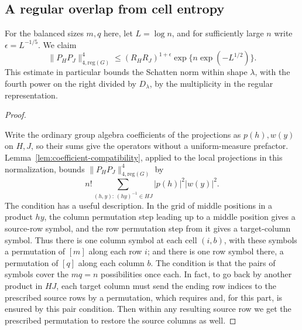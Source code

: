\subsection{A regular overlap from cell entropy}

\begin{proposition}\label{tra:harmonic-overlaps:dense}

\label{tra:harmonic-overlaps:dense-overlap-statement}
For the balanced sizes \(m,q\) here, let \(L=\log n\), and for sufficiently large \(n\) write \(\epsilon=L^{-1/5}\). We claim
\begin{equation}
       \|P_H P_J\|_{4,\mathrm{reg}(G)}^4
              \le (R_H R_J)^{1+\epsilon}
                       \exp\{ n\exp(-L^{1/2})\}.                            \label{tra:harmonic-overlaps:eq5}
\end{equation}
This estimate in particular bounds the Schatten norm within shape \(\lambda\), with the fourth power on the right divided by \(D_\lambda\), by the multiplicity in the regular representation.

\end{proposition}\begin{proof}\label{tra:harmonic-overlaps:dense-proof}

\label{tra:harmonic-overlaps:coefficients-and-tilted-entropy}
Write the ordinary group algebra coefficients of the projections as
$p(h),w(y)$ on $H,J$, so their sums give the operators without a
uniform-measure prefactor. Lemma~\ref{lem:coefficient-compatibility},
applied to the local projections in this normalization, bounds
$\|P_HP_J\|_{4,\mathrm{reg}(G)}^4$ by
\begin{equation}
                   n! \sum_{(h,y):\, (hy)^{-1}\in HJ}|p(h)|^2 |w(y)|^2.   \label{tra:harmonic-overlaps:eq6}
\end{equation}
The condition has a useful description. In the grid of middle positions in a product \(hy\), the column permutation step leading up to a middle position gives a source-row symbol, and the row permutation step from it gives a target-column symbol. Thus there is one column symbol at each cell \((i,b)\), with these symbols a permutation of \([m]\) along each row \(i\); and there is one row symbol there, a permutation of \([q]\) along each column \(b\). The condition is that the pairs of symbols cover the \(m q=n\) possibilities once each. In fact, to go back by another product in \(HJ\), each target column must send the ending row indices to the prescribed source rows by a permutation, which requires and, for this part, is ensured by this pair condition. Then within any resulting source row we get the prescribed permutation to restore the source columns as well.


\end{proof}
